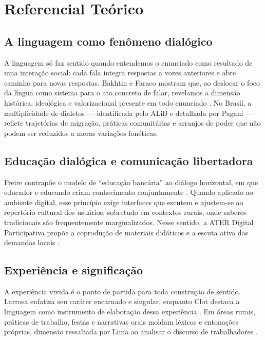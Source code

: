 \chapter{Referencial Teórico}

\section{A linguagem como fenômeno dialógico}
A linguagem só faz sentido quando entendemos o enunciado como resultado de uma interação social: cada fala integra respostas a vozes anteriores e abre caminho para novas respostas. Bakhtin e Faraco mostram que, ao deslocar o foco da língua como sistema para o ato concreto de falar, revelamos a dimensão histórica, ideológica e valorizacional presente em todo enunciado \cite{faraco2009, bakhtin1997estetica}. No Brasil, a multiplicidade de dialetos — identificada pelo ALiB \cite{cardoso2014alib} e detalhada por Pagani \cite{pagani2022} — reflete trajetórias de migração, práticas comunitárias e arranjos de poder que não podem ser reduzidos a meras variações fonéticas.

\section{Educação dialógica e comunicação libertadora}
Freire contrapõe o modelo de “educação bancária” ao diálogo horizontal, em que educador e educando criam conhecimento conjuntamente \cite{freire2005pedagogia, freire2013extensao}. Quando aplicado ao ambiente digital, esse princípio exige interfaces que escutem e ajustem-se ao repertório cultural dos usuários, sobretudo em contextos rurais, onde saberes tradicionais são frequentemente marginalizados. Nesse sentido, a ATER Digital Participativa propõe a coprodução de materiais didáticos e a escuta ativa das demandas locais \cite{parra2022ater, lopes2022}.

\section{Experiência e significação}
A experiência vivida é o ponto de partida para toda construção de sentido. Larrosa enfatiza seu caráter encarnado e singular, enquanto Clot destaca a linguagem como instrumento de elaboração dessa experiência \cite{larrosa2014, clot2007trabalho}. Em áreas rurais, práticas de trabalho, festas e narrativas orais moldam léxicos e entonações próprias, dimensão ressaltada por Lima ao analisar o discurso de trabalhadores \cite{lima2006}.

